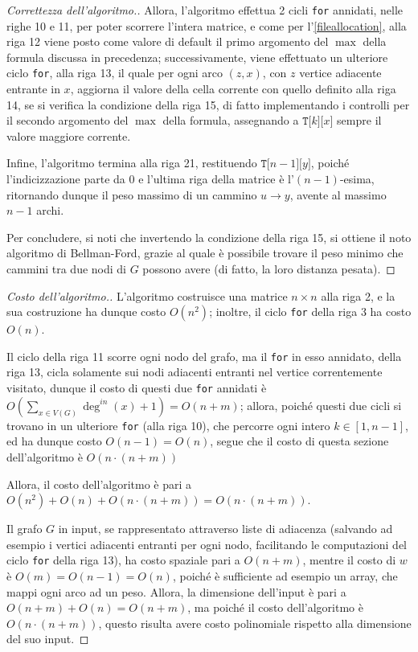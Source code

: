 \documentclass[a4paper, 12pt]{report}
\begin{document}
\begin{proof}[Correttezza dell'algoritmo.]
        Allora, l'algoritmo effettua 2 cicli \texttt{for} annidati, nelle righe 10 e 11, per poter scorrere l'intera matrice, e come per l'\cref{fileallocation}, alla riga 12 viene posto come valore di default il primo argomento del $\max$ della formula discussa in precedenza; successivamente, viene effettuato un ulteriore ciclo \texttt{for}, alla riga 13, il quale per ogni arco $(z, x)$, con $z$ vertice adiacente entrante in $x$, aggiorna il valore della cella corrente con quello definito alla riga 14, se si verifica la condizione della riga 15, di fatto implementando i controlli per il secondo argomento del $\max$ della formula, assegnando a $\texttt{T[}k\texttt{][}x\texttt{]}$ sempre il valore maggiore corrente.

        Infine, l'algoritmo termina alla riga 21, restituendo $\texttt{T[}n - 1\texttt{][}y\texttt{]}$, poiché l'indicizzazione parte da $0$ e l'ultima riga della matrice è l'$(n - 1)$-esima, ritornando dunque il peso massimo di un cammino $u \rightarrow y$, avente al massimo $n - 1$ archi.

        Per concludere, si noti che invertendo la condizione della riga 15, si ottiene il noto algoritmo di Bellman-Ford, grazie al quale è possibile trovare il peso minimo che cammini tra due nodi di $G$ possono avere (di fatto, la loro distanza pesata).
    \end{proof}

    \begin{proof}[Costo dell'algoritmo.]
        L'algoritmo costruisce una matrice $n \times n$ alla riga 2, e la sua costruzione ha dunque costo $O(n^2)$; inoltre, il ciclo \texttt{for} della riga 3 ha costo $O(n)$.

        Il ciclo della riga 11 scorre ogni nodo del grafo, ma il \texttt{for} in esso annidato, della riga 13, cicla solamente sui nodi adiacenti entranti nel vertice correntemente visitato, dunque il costo di questi due \texttt{for} annidati è $\displaystyle O\left(\sum_{x \in V(G)}{\deg^{in}(x) + 1} \right) = O(n + m)$; allora, poiché questi due cicli si trovano in un ulteriore \texttt{for} (alla riga 10), che percorre ogni intero $k \in [1, n- 1]$, ed ha dunque costo $O(n - 1) = O(n)$, segue che il costo di questa sezione dell'algoritmo è $O(n \cdot (n + m))$

        Allora, il costo dell'algoritmo è pari a $O(n ^2) + O(n) + O(n \cdot(n + m)) = O(n \cdot (n + m))$.

        Il grafo $G$ in input, se rappresentato attraverso liste di adiacenza (salvando ad esempio i vertici adiacenti entranti per ogni nodo, facilitando le computazioni del ciclo \texttt{for} della riga 13), ha costo spaziale pari a $O(n + m)$, mentre il costo di $w$ è $O(m) = O(n - 1) = O(n)$, poiché è sufficiente ad esempio un array, che mappi ogni arco ad un peso. Allora, la dimensione dell'input è pari a $O(n + m) + O(n) = O(n + m)$, ma poiché il costo dell'algoritmo è $O(n \cdot (n + m))$, questo risulta avere costo polinomiale rispetto alla dimensione del suo input.
    \end{proof}
\end{document}
